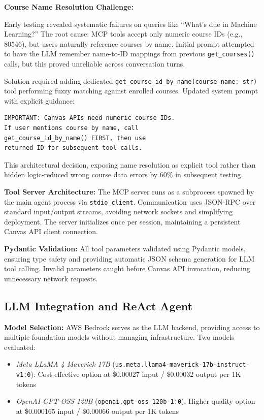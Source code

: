 \documentclass{article}
\begin{document}
\textbf{Course Name Resolution Challenge:}

Early testing revealed systematic failures on queries like ``What's due in Machine Learning?'' The root cause: MCP tools accept only numeric course IDs (e.g., 80546), but users naturally reference courses by name. Initial prompt attempted to have the LLM remember name-to-ID mappings from previous \texttt{get\_courses()} calls, but this proved unreliable across conversation turns.

Solution required adding dedicated \texttt{get\_course\_id\_by\_name(course\_name: str)} tool performing fuzzy matching against enrolled courses. Updated system prompt with explicit guidance:

\begin{verbatim}
IMPORTANT: Canvas APIs need numeric course IDs.
If user mentions course by name, call 
get_course_id_by_name() FIRST, then use 
returned ID for subsequent tool calls.
\end{verbatim}

This architectural decision, exposing name resolution as explicit tool rather than hidden logic-reduced wrong course data errors by 60\% in subsequent testing.


\textbf{Tool Server Architecture:} The MCP server runs as a subprocess spawned by the main agent process via \texttt{stdio\_client}. Communication uses JSON-RPC over standard input/output streams, avoiding network sockets and simplifying deployment. The server initializes once per session, maintaining a persistent Canvas API client connection.

\textbf{Pydantic Validation:} All tool parameters validated using Pydantic models, ensuring type safety and providing automatic JSON schema generation for LLM tool calling. Invalid parameters caught before Canvas API invocation, reducing unnecessary network requests.

\subsection{LLM Integration and ReAct Agent}

\textbf{Model Selection:} AWS Bedrock serves as the LLM backend, providing access to multiple foundation models without managing infrastructure. Two models evaluated:

\begin{itemize}
    \item \textit{Meta LLaMA 4 Maverick 17B} (\texttt{us.meta.llama4-maverick-17b-instruct-v1:0}): Cost-effective option at \$0.00027 input / \$0.00032 output per 1K tokens
    \item \textit{OpenAI GPT-OSS 120B} (\texttt{openai.gpt-oss-120b-1:0}): Higher quality option at \$0.000165 input / \$0.00066 output per 1K tokens
\end{itemize}
\end{document}
